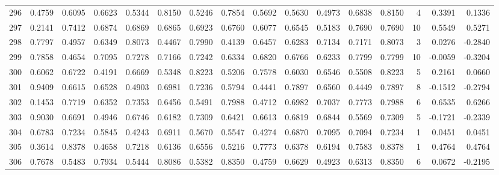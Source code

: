 \begin{tabular}{lrrrrrrrrrrrrrrr}
296 &      0.4759 &  0.6095 &  0.6623 &  0.5344 &  0.8150 &  0.5246 &  0.7854 &  0.5692 &  0.5630 &  0.4973 &   0.6838 &     0.8150 &      4 &                    0.3391 &                     0.1336 \\
297 &      0.2141 &  0.7412 &  0.6874 &  0.6869 &  0.6865 &  0.6923 &  0.6760 &  0.6077 &  0.6545 &  0.5183 &   0.7690 &     0.7690 &     10 &                    0.5549 &                     0.5271 \\
298 &      0.7797 &  0.4957 &  0.6349 &  0.8073 &  0.4467 &  0.7990 &  0.4139 &  0.6457 &  0.6283 &  0.7134 &   0.7171 &     0.8073 &      3 &                    0.0276 &                    -0.2840 \\
299 &      0.7858 &  0.4654 &  0.7095 &  0.7278 &  0.7166 &  0.7242 &  0.6334 &  0.6820 &  0.6766 &  0.6233 &   0.7799 &     0.7799 &     10 &                   -0.0059 &                    -0.3204 \\
300 &      0.6062 &  0.6722 &  0.4191 &  0.6669 &  0.5348 &  0.8223 &  0.5206 &  0.7578 &  0.6030 &  0.6546 &   0.5508 &     0.8223 &      5 &                    0.2161 &                     0.0660 \\
301 &      0.9409 &  0.6615 &  0.6528 &  0.4903 &  0.6981 &  0.7236 &  0.5794 &  0.4441 &  0.7897 &  0.6560 &   0.4449 &     0.7897 &      8 &                   -0.1512 &                    -0.2794 \\
302 &      0.1453 &  0.7719 &  0.6352 &  0.7353 &  0.6456 &  0.5491 &  0.7988 &  0.4712 &  0.6982 &  0.7037 &   0.7773 &     0.7988 &      6 &                    0.6535 &                     0.6266 \\
303 &      0.9030 &  0.6691 &  0.4946 &  0.6746 &  0.6182 &  0.7309 &  0.6421 &  0.6613 &  0.6819 &  0.6844 &   0.5569 &     0.7309 &      5 &                   -0.1721 &                    -0.2339 \\
304 &      0.6783 &  0.7234 &  0.5845 &  0.4243 &  0.6911 &  0.5670 &  0.5547 &  0.4274 &  0.6870 &  0.7095 &   0.7094 &     0.7234 &      1 &                    0.0451 &                     0.0451 \\
305 &      0.3614 &  0.8378 &  0.4658 &  0.7218 &  0.6136 &  0.6556 &  0.5216 &  0.7773 &  0.6378 &  0.6194 &   0.7583 &     0.8378 &      1 &                    0.4764 &                     0.4764 \\
306 &      0.7678 &  0.5483 &  0.7934 &  0.5444 &  0.8086 &  0.5382 &  0.8350 &  0.4759 &  0.6629 &  0.4923 &   0.6313 &     0.8350 &      6 &                    0.0672 &                    -0.2195 \\

\end{tabular}
